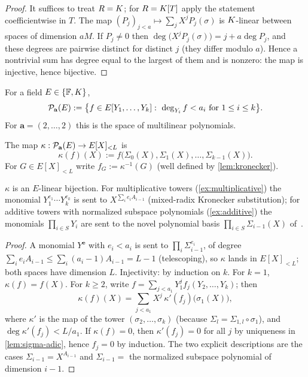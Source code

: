 \begin{proof}
It suffices to treat $R=K$; for $R=K[T]$ apply the statement coefficientwise in $T$.
The map $(P_j)_{j<a}\mapsto\sum_jX^jP_j(\sigma)$ is $K$-linear between spaces of dimension
$aM$. If $P_j\ne0$ then $\deg\bigl(X^jP_j(\sigma)\bigr)=j+a\deg P_j$, and these degrees are
pairwise distinct for distinct $j$ (they differ modulo $a$). Hence a nontrivial sum has
degree equal to the largest of them and is nonzero: the map is injective, hence bijective.
\end{proof}

\begin{definition}\label{def:Pa}
For a field $E\in\{\mathbb{F},K\}$,
\[
\Pa(E):=\bigl\{f\in E[Y_1,\dots,Y_k]:\ \deg_{Y_i}f<a_i\ \text{for }1\le i\le k\bigr\}.
\]
For $\mathbf a=(2,\dots,2)$ this is the space of multilinear polynomials.
\end{definition}

\begin{definition}\label{def:kronecker}
The map $\kappa:\mathcal{P}_{\mathbf a}(E)\to E[X]_{<L}$ is
\[
\kappa(f)(X):=f\bigl(\Sigma_0(X),\Sigma_1(X),\dots,\Sigma_{k-1}(X)\bigr).
\]
For $G\in E[X]_{<L}$ write $f_G:=\kappa^{-1}(G)$ (well defined by \cref{lem:kronecker}).
\end{definition}

\begin{lemma}\label{lem:kronecker}
$\kappa$ is an $E$-linear bijection. For multiplicative towers
(\cref{ex:multiplicative}) the monomial $Y_1^{e_1}\cdots Y_k^{e_k}$ is sent to
$X^{\sum_ie_iA_{i-1}}$ (mixed-radix Kronecker substitution); for additive towers with
normalized subspace polynomials (\cref{ex:additive}) the monomials $\prod_{i\in S}Y_i$ are
sent to the novel polynomial basis $\prod_{i\in S}\Sigma_{i-1}(X)$ of~\cite{LCH14}.
\end{lemma}

\begin{proof}
A monomial $Y^{\mathbf e}$ with $e_i<a_i$ is sent to $\prod_i\Sigma_{i-1}^{e_i}$, of degree
$\sum_ie_iA_{i-1}\le\sum_i(a_i-1)A_{i-1}=L-1$ (telescoping), so $\kappa$ lands in
$E[X]_{<L}$; both spaces have dimension $L$. Injectivity: by induction on $k$. For $k=1$,
$\kappa(f)=f(X)$. For $k\ge2$, write $f=\sum_{j<a_1}Y_1^jf_j(Y_2,\dots,Y_k)$; then
\[
\kappa(f)(X)=\sum_{j<a_1}X^j\,\kappa'(f_j)\bigl(\sigma_1(X)\bigr),
\]
where $\kappa'$ is the map of the tower $(\sigma_2,\dots,\sigma_k)$ (because
$\Sigma_{l}=\Sigma_{1,l}\circ\sigma_1$), and $\deg\kappa'(f_j)<L/a_1$. If $\kappa(f)=0$, then
$\kappa'(f_j)=0$ for all $j$ by uniqueness in \cref{lem:sigma-adic}, hence $f_j=0$ by
induction. The two explicit descriptions are the cases $\Sigma_{i-1}=X^{A_{i-1}}$ and
$\Sigma_{i-1}=$ the normalized subspace polynomial of dimension $i-1$.
\end{proof}

